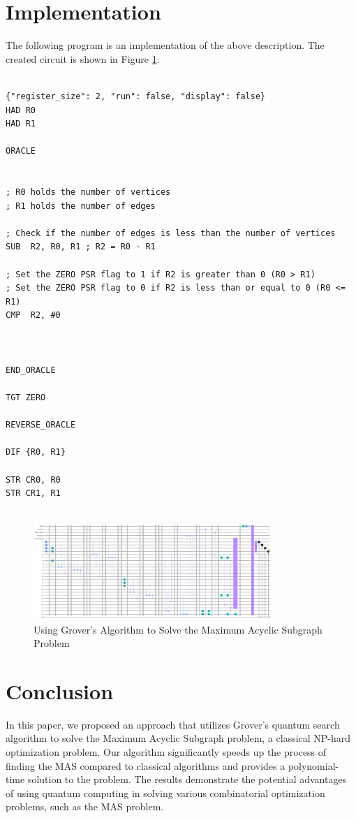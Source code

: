 \section{Implementation}

The following program is an implementation of the above description. The created circuit is shown in Figure \ref{fig:Maximum_Acyclic_Subgraph}:

\begin{lstlisting}

{"register_size": 2, "run": false, "display": false}
HAD R0
HAD R1

ORACLE


; R0 holds the number of vertices
; R1 holds the number of edges

; Check if the number of edges is less than the number of vertices
SUB  R2, R0, R1 ; R2 = R0 - R1

; Set the ZERO PSR flag to 1 if R2 is greater than 0 (R0 > R1)
; Set the ZERO PSR flag to 0 if R2 is less than or equal to 0 (R0 <= R1)
CMP  R2, #0



END_ORACLE

TGT ZERO

REVERSE_ORACLE

DIF {R0, R1}

STR CR0, R0
STR CR1, R1


\end{lstlisting}

\begin{figure}[htp]
    \centering
    \includegraphics[width=9cm]{Figures/Maximum_Acyclic_Subgraph_circuit.png}
    \caption{Using Grover's Algorithm to Solve the Maximum Acyclic Subgraph Problem}
    \label{fig:Maximum_Acyclic_Subgraph}
\end{figure}

\section{Conclusion}
\label{sec:conclusion}
In this paper, we proposed an approach that utilizes Grover's quantum search algorithm to solve the Maximum Acyclic Subgraph problem, a classical NP-hard optimization problem. Our algorithm significantly speeds up the process of finding the MAS compared to classical algorithms and provides a polynomial-time solution to the problem. The results demonstrate the potential advantages of using quantum computing in solving various combinatorial optimization problems, such as the MAS problem.

